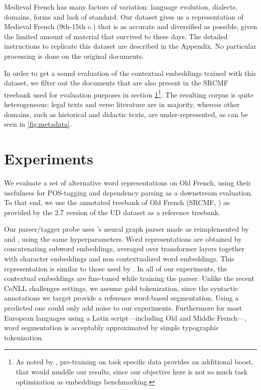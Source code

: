 Medieval French has many factors of variation: language evolution, dialects, domains, forms and lack of standard. Our dataset gives us a representation of Medieval French (9th-15th c.) that is as accurate and diversified as possible, given the limited amount of material that survived to these days. The detailed instructions to replicate this dataset are described in the Appendix. No particular processing is done on the original documents.

In order to get a sound evaluation of the contextual embeddings trained with this dataset, we filter out the documents that are also present in the SRCMF treebank used for evaluation purposes in section \ref{sec-experiments}\footnote{As noted by \citet{gururangan-etal-2020-dont}, pre-training on task specific data provides an additional boost, that would muddle our results, since our objective here is not so much task optimization as embeddings benchmarking.}.
The resulting corpus is quite heterogeneous: legal texts and verse literature are in majority, whereas other domains, such as historical and didactic texts, are under-represented, as can be seen in \cref{fig:metadata}.

\section{Experiments}
\label{sec-experiments}
We evaluate a set of alternative word representations on Old French, using their usefulness for POS-tagging and dependency parsing as a downstream evaluation.
To that end, we use the annotated treebank of Old French (SRCMF,  \citet{SRCMF2013PrevostStein}) as provided by the 2.7 version of the UD dataset \citep{zeman2020UniversalDependenciesa} as a reference treebank.

Our parser/tagger probe uses \citet{dozat-manning-2018-simpler}'s neural graph parser made as reimplemented by \citet{le-etal-2020-flaubert} and \citet{grobol:hal-03223424}, using the same hyperparameters. 
Word representations are obtained by concatenating subword embeddings, averaged over transformer layers together with character embeddings and non contextualized word embeddings.  %
This representation is similar to those used by \citet{straka2019EvaluatingContextualizedEmbeddings,ling-etal-2015-finding}.
In all of our experiments, the contextual embeddings are fine-tuned while training the parser.
Unlike the recent CoNLL challenges settings, we assume gold tokenization, since the syntactic annotations we target provide a reference word-based segmentation. Using a predicted one could only add noise to our experiments.
Furthermore for most European languages using a Latin script---including Old and Middle French---, word segmentation is acceptably approximated by simple typographic tokenization.

